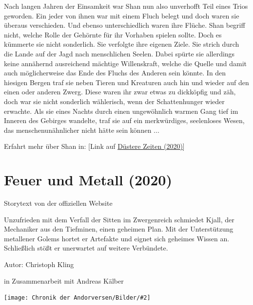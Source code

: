 \documentclass[10pt, a4paper, oneside]{book}
\newcommand{\fillbreak}{\vspace*{\fill}\columnbreak}
\newcommand{\storytext}[1]{%
    \section{#1}%
    \label{Storytext: #1}%
}
\newcommand{\refprodukt}[1]{\hyperref[Produkt: #1]{#1}}
\newcommand{\bildmitts}[2][height=0.32\textwidth,width=0.48\textwidth,keepaspectratio]{%
    \begin{center}
        \texttt{[image: Chronik der Andorversen/Bilder/\#2]}
    \end{center}
}
\begin{document}
\begin{multicols}{2}
Nach langen Jahren der Einsamkeit war Shan nun also unverhofft Teil eines Trios geworden. Ein jeder von ihnen war mit einem Fluch belegt und doch waren sie überaus verschieden. Und ebenso unterschiedlich waren ihre Flüche. Shan begriff nicht, welche Rolle der Gehörnte für ihr Vorhaben spielen sollte. Doch es kümmerte sie nicht sonderlich. Sie verfolgte ihre eigenen Ziele. Sie strich durch die Lande auf der Jagd nach menschlichen Seelen. Dabei spürte sie allerdings keine annähernd ausreichend mächtige Willenskraft, welche die Quelle und damit auch möglicherweise das Ende des Fluchs des Anderen sein könnte. In den hiesigen Bergen traf sie neben Tieren und Kreaturen auch hin und wieder auf den einen oder anderen Zwerg. Diese waren ihr zwar etwas zu dickköpfig und zäh, doch war sie nicht sonderlich wählerisch, wenn der Schattenhunger wieder erwachte. Als sie eines Nachts durch einen ungewöhnlich warmen Gang tief im Inneren des Gebirges wandelte, traf sie auf ein merkwürdiges, seelenloses Wesen, das menschenunähnlicher nicht hätte sein können ...\bigskip

Erfahrt mehr über Shan in: [Link auf \refprodukt{Düstere Zeiten (2020)}]






\fillbreak
\storytext{Feuer und Metall (2020)}


\begin{center}
    Storytext von der offiziellen Website
\end{center}

Unzufrieden mit dem Verfall der Sitten im Zwergenreich schmiedet Kjall, der Mechaniker aus den Tiefminen, einen geheimen Plan. Mit der Unterstützung metallener Golems hortet er Artefakte und eignet sich geheimes Wissen an. Schließlich stößt er unerwartet auf weitere Verbündete.\bigskip

Autor: Christoph Kling

in Zusammenarbeit mit Andreas Kälber\bigskip

\bildmitts{Feuer und Metall Bild 1.jpg}


\end{multicols}
\end{document}
